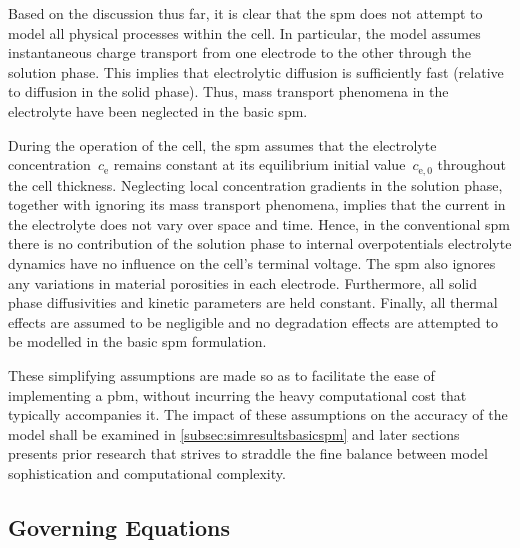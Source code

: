 Based  on the  discussion thus  far, it  is clear  that the  \gls{spm} does  not
attempt to  model all  physical processes  within the  cell. In  particular, the
model assumes  instantaneous charge  transport from one  electrode to  the other
through  the  solution  phase.  This  implies  that  electrolytic  diffusion  is
sufficiently  fast  (relative to  diffusion  in  the  solid phase).  Thus,  mass
transport  phenomena  in  the  electrolyte  have been  neglected  in  the  basic
\gls{spm}.


During   the  operation   of  the   cell,   the  \gls{spm}   assumes  that   the
electrolyte  concentration~$c_\text{e}$  remains  constant  at  its  equilibrium
initial value~$c_{\text{e},0}$  throughout the cell thickness.  Neglecting local
concentration gradients in  the solution phase, together with  ignoring its mass
transport phenomena, implies  that the current in the electrolyte  does not vary
over  space  and  time.  Hence,  in  the  conventional  \gls{spm}  there  is  no
contribution of the solution phase  to internal overpotentials \ie{} electrolyte
dynamics have  no influence on the  cell's terminal voltage. The  \gls{spm} also
ignores any  variations in material  porosities in each  electrode. Furthermore,
all solid phase diffusivities and kinetic parameters are held constant. Finally,
all thermal effects are assumed to  be negligible and no degradation effects are
attempted to be modelled in the basic \gls{spm} formulation.

These  simplifying  assumptions  are  made  so as  to  facilitate  the  ease  of
implementing a  \gls{pbm}, without incurring  the heavy computational  cost that
typically accompanies it. The impact of these assumptions on the accuracy of the
model shall  be examined in \cref{subsec:simresultsbasicspm}  and later sections
presents prior research that strives to  straddle the fine balance between model
sophistication and computational complexity.

\subsection{Governing  Equations}\label{subsec:basicspmgoverningeqns}



